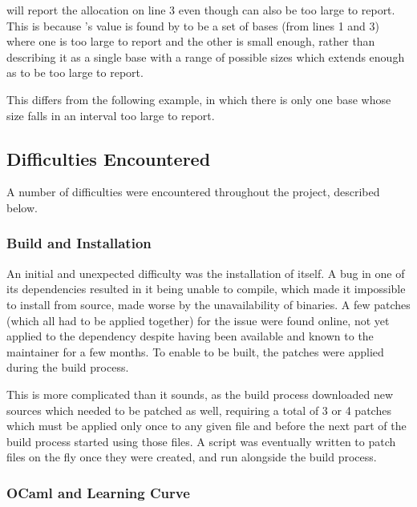 

 will report the allocation on line 3 even though  can also be too large to report. This is because 's value is found by  to be a set of bases (from lines 1 and 3) where one is too large to report and the other is small enough, rather than describing it as a single base with a range of possible sizes which extends enough as to be too large to report.

This differs from the following example, in which there is only one base whose size falls in an interval too large to report.



\subsection{Difficulties Encountered}

A number of difficulties were encountered throughout the project, described below.

\subsubsection{Build and Installation}

An initial and unexpected difficulty was the installation of  itself. A bug in one of its dependencies resulted in it being unable to compile, which made it impossible to install from source, made worse by the unavailability of binaries. A few patches (which all had to be applied together) for the issue were found online, not yet applied to the dependency despite having been available and known to the maintainer for a few months. To enable  to be built, the patches were applied during the build process.

This is more complicated than it sounds, as the build process downloaded new sources which needed to be patched as well, requiring a total of 3 or 4 patches which must be applied only once to any given file and before the next part of the build process started using those files. A script was eventually written to patch files on the fly once they were created, and run alongside the build process.

\subsubsection{OCaml and  Learning Curve}

